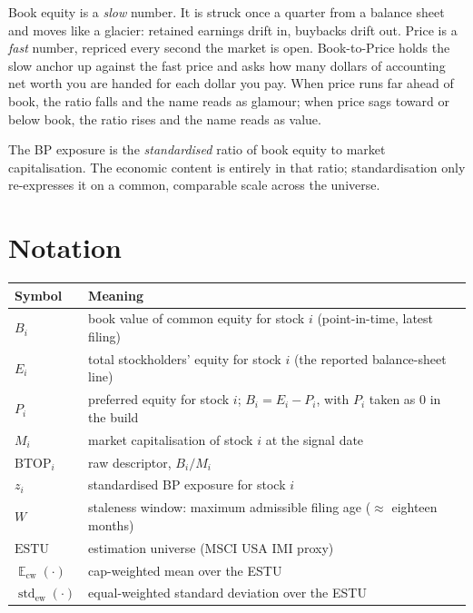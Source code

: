 \documentclass[11pt]{article}
\theoremstyle{definition}
\theoremstyle{plain}
\theoremstyle{remark}
\DeclareMathOperator{\std}{std}
\DeclareMathOperator*{\avg}{\mathbb{E}}
\begin{document}
\begin{intuition}
Book equity is a \emph{slow} number. It is struck once a quarter from a balance sheet and moves like a glacier: retained earnings drift in, buybacks drift out. Price is a \emph{fast} number, repriced every second the market is open. Book-to-Price holds the slow anchor up against the fast price and asks how many dollars of accounting net worth you are handed for each dollar you pay. When price runs far ahead of book, the ratio falls and the name reads as glamour; when price sags toward or below book, the ratio rises and the name reads as value.
\end{intuition}

\begin{keyresult}
The BP exposure is the \emph{standardised} ratio of book equity to market capitalisation. The economic content is entirely in that ratio; standardisation only re-expresses it on a common, comparable scale across the universe.
\end{keyresult}

\section*{Notation}

\begin{center}
\begin{tabular}{ll}
\toprule
Symbol & Meaning \\
\midrule
$B_i$ & book value of common equity for stock $i$ (point-in-time, latest filing) \\
$E_i$ & total stockholders' equity for stock $i$ (the reported balance-sheet line) \\
$P_i$ & preferred equity for stock $i$; $B_i = E_i - P_i$, with $P_i$ taken as $0$ in the build \\
$M_i$ & market capitalisation of stock $i$ at the signal date \\
$\mathrm{BTOP}_i$ & raw descriptor, $B_i / M_i$ \\
$z_i$ & standardised BP exposure for stock $i$ \\
$W$ & staleness window: maximum admissible filing age ($\approx$ eighteen months) \\
$\mathrm{ESTU}$ & estimation universe (MSCI USA IMI proxy) \\
$\avg_{\mathrm{cw}}(\cdot)$ & cap-weighted mean over the ESTU \\
$\std_{\mathrm{ew}}(\cdot)$ & equal-weighted standard deviation over the ESTU \\
\bottomrule
\end{tabular}
\end{center}
\end{document}
